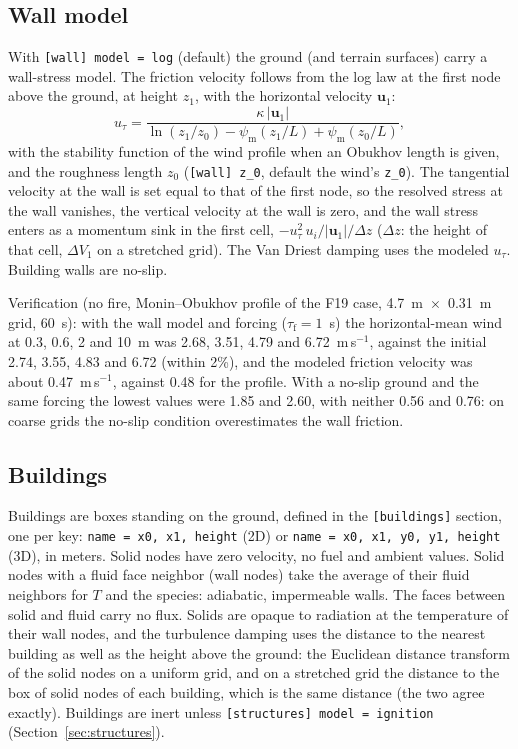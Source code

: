 \documentclass[11pt,a4paper]{article}
\newcommand{\code}[1]{\texttt{#1}}
\begin{document}
\subsection{Wall model}\label{sec:wall}
With \code{[wall] model = log} (default) the ground (and terrain surfaces) carry a wall-stress model.
The friction velocity follows from the log law at the first node above the ground, at height $z_1$,
with the horizontal velocity $\mathbf{u}_1$:
\begin{equation}
  u_\tau = \frac{\kappa\,|\mathbf{u}_1|}{\ln(z_1/z_0) - \psi_\text{m}(z_1/L) + \psi_\text{m}(z_0/L)},
\end{equation}
with the stability function of the wind profile when an Obukhov length is given, and the roughness
length $z_0$ (\code{[wall] z\_0}, default the wind's \code{z\_0}). The tangential velocity at the wall
is set equal to that of the first node, so the resolved stress at the wall vanishes, the vertical
velocity at the wall is zero, and the wall stress enters as a momentum sink in the first cell,
$-u_\tau^2\,u_i/|\mathbf{u}_1|/\Delta z$ ($\Delta z$: the height of that cell, $\Delta V_1$ on a stretched grid). The Van Driest damping uses the modeled $u_\tau$. Building
walls are no-slip.

Verification (no fire, Monin--Obukhov profile of the F19 case, 4.7~m~$\times$~0.31~m grid, 60~s):
with the wall model and forcing ($\tau_\text{f}=1$~s) the horizontal-mean wind at 0.3, 0.6, 2 and 10~m
was 2.68, 3.51, 4.79 and 6.72~m\,s$^{-1}$, against the initial 2.74, 3.55, 4.83 and 6.72 (within 2\%),
and the modeled friction velocity was about 0.47~m\,s$^{-1}$, against 0.48 for the profile. With a
no-slip ground and the same forcing the lowest values were 1.85 and 2.60, with neither 0.56 and
0.76: on coarse grids the no-slip condition overestimates the wall friction.

\subsection{Buildings}
Buildings are boxes standing on the ground, defined in the \code{[buildings]} section, one per key:
\code{name = x0, x1, height} (2D) or \code{name = x0, x1, y0, y1, height} (3D), in meters. Solid nodes have
zero velocity, no fuel and ambient values. Solid nodes with a fluid face neighbor (wall nodes) take
the average of their fluid neighbors for $T$ and the species: adiabatic, impermeable walls. The faces
between solid and fluid carry no flux. Solids are opaque to radiation at the temperature of their
wall nodes, and the turbulence damping uses the distance to the nearest building as well as the
height above the ground: the Euclidean distance transform of the solid nodes on a uniform grid, and on a
stretched grid the distance to the box of solid nodes of each building, which is the same distance (the
two agree exactly). Buildings are inert unless \code{[structures] model = ignition}
(Section~\ref{sec:structures}).
\end{document}
